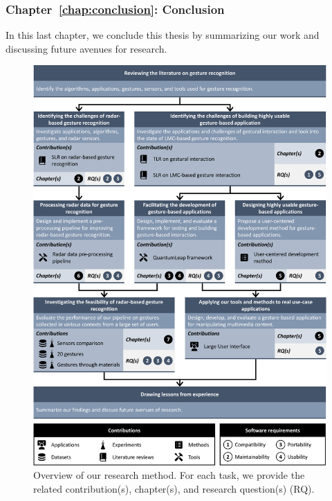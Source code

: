 
\subsubsection{Chapter~\ref{chap:conclusion}: Conclusion} 
In this last chapter, we conclude this thesis by summarizing our work and discussing future avenues for research.

\begin{figure}
    \centering
    \includegraphics[width=\linewidth]{Figures/Introduction/graphical-summary.pdf}
    \vspace{-18pt}
    \caption{Overview of our research method. For each task, we provide the related contribution(s), chapter(s), and research question(s) (RQ).}
    \label{fig:graphical-summary}
\end{figure}
